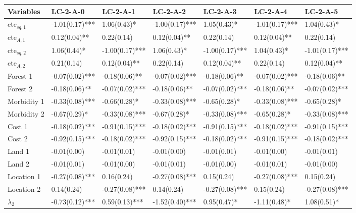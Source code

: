 \begin{tabular}{lllllll}
  \hline
Variables & LC-2-A-0 & LC-2-A-1 & LC-2-A-2 & LC-2-A-3 & LC-2-A-4 & LC-2-A-5 \\ 
  \hline
cte$_{sq,1}$ & -1.01(0.17)*** &  1.06(0.43)*   & -1.00(0.17)*** &  1.05(0.43)*   & -1.01(0.17)*** &  1.04(0.43)*   \\ 
  cte$_{A ,1}$ &  0.12(0.04)**  &  0.22(0.14)    &  0.12(0.04)**  &  0.22(0.14)    &  0.12(0.04)**  &  0.22(0.14)    \\ 
  cte$_{sq,2}$ &  1.06(0.44)*   & -1.00(0.17)*** &  1.06(0.43)*   & -1.00(0.17)*** &  1.04(0.43)*   & -1.01(0.17)*** \\ 
  cte$_{A ,2}$ &  0.21(0.14)    &  0.12(0.04)**  &  0.22(0.14)    &  0.12(0.04)**  &  0.22(0.14)    &  0.12(0.04)**  \\ 
  Forest 1 & -0.07(0.02)*** & -0.18(0.06)**  & -0.07(0.02)*** & -0.18(0.06)**  & -0.07(0.02)*** & -0.18(0.06)**  \\ 
  Forest 2 & -0.18(0.06)**  & -0.07(0.02)*** & -0.18(0.06)**  & -0.07(0.02)*** & -0.18(0.06)**  & -0.07(0.02)*** \\ 
  Morbidity 1 & -0.33(0.08)*** & -0.66(0.28)*   & -0.33(0.08)*** & -0.65(0.28)*   & -0.33(0.08)*** & -0.65(0.28)*   \\ 
  Morbidity 2 & -0.67(0.29)*   & -0.33(0.08)*** & -0.67(0.28)*   & -0.33(0.08)*** & -0.65(0.28)*   & -0.33(0.08)*** \\ 
  Cost 1 & -0.18(0.02)*** & -0.91(0.15)*** & -0.18(0.02)*** & -0.91(0.15)*** & -0.18(0.02)*** & -0.91(0.15)*** \\ 
  Cost 2 & -0.92(0.15)*** & -0.18(0.02)*** & -0.92(0.15)*** & -0.18(0.02)*** & -0.91(0.15)*** & -0.18(0.02)*** \\ 
  Land 1 & -0.01(0.00)    & -0.01(0.01)    & -0.01(0.00)    & -0.01(0.01)    & -0.01(0.00)    & -0.01(0.01)    \\ 
  Land 2 & -0.01(0.01)    & -0.01(0.00)    & -0.01(0.01)    & -0.01(0.00)    & -0.01(0.01)    & -0.01(0.00)    \\ 
  Location 1 & -0.27(0.08)*** &  0.16(0.24)    & -0.27(0.08)*** &  0.15(0.24)    & -0.27(0.08)*** &  0.15(0.24)    \\ 
  Location 2 &  0.14(0.24)    & -0.27(0.08)*** &  0.14(0.24)    & -0.27(0.08)*** &  0.15(0.24)    & -0.27(0.08)*** \\ 
  $\lambda_{2}$ & -0.73(0.12)*** &  0.59(0.13)*** & -1.52(0.40)*** &  0.95(0.47)*   & -1.11(0.48)*   &  1.08(0.51)*   \\ 

\end{tabular}

